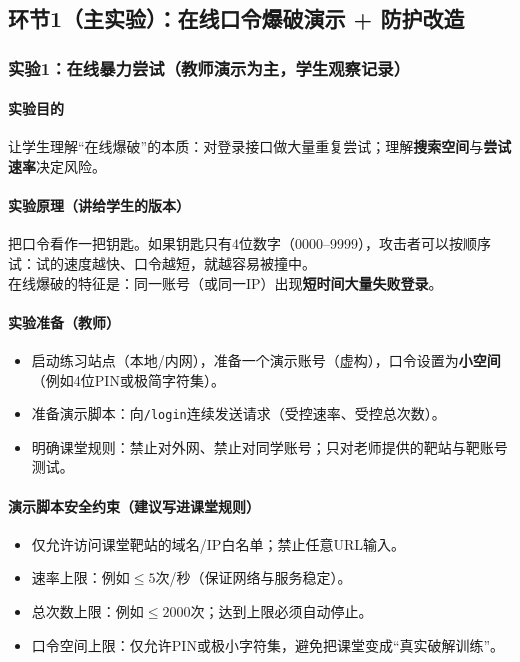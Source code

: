 \documentclass[UTF8,a4paper,12pt]{ctexart}
\begin{document}
\subsection{环节1（主实验）：在线口令爆破演示 + 防护改造}

\subsubsection{实验1：在线暴力尝试（教师演示为主，学生观察记录）}
\paragraph{实验目的}
让学生理解``在线爆破''的本质：对登录接口做大量重复尝试；理解\textbf{搜索空间}与\textbf{尝试速率}决定风险。

\paragraph{实验原理（讲给学生的版本）}
把口令看作一把钥匙。如果钥匙只有4位数字（0000--9999），攻击者可以按顺序试：试的速度越快、口令越短，就越容易被撞中。\\
在线爆破的特征是：同一账号（或同一IP）出现\textbf{短时间大量失败登录}。

\paragraph{实验准备（教师）}
\begin{itemize}
  \item 启动练习站点（本地/内网），准备一个演示账号（虚构），口令设置为\textbf{小空间}（例如4位PIN或极简字符集）。
  \item 准备演示脚本：向\texttt{/login}连续发送请求（受控速率、受控总次数）。
  \item 明确课堂规则：禁止对外网、禁止对同学账号；只对老师提供的靶站与靶账号测试。
\end{itemize}

\paragraph{演示脚本安全约束（建议写进课堂规则）}
\begin{itemize}
  \item 仅允许访问课堂靶站的域名/IP白名单；禁止任意URL输入。
  \item 速率上限：例如$\le 5$次/秒（保证网络与服务稳定）。
  \item 总次数上限：例如$\le 2000$次；达到上限必须自动停止。
  \item 口令空间上限：仅允许PIN或极小字符集，避免把课堂变成``真实破解训练''。
\end{itemize}
\end{document}
